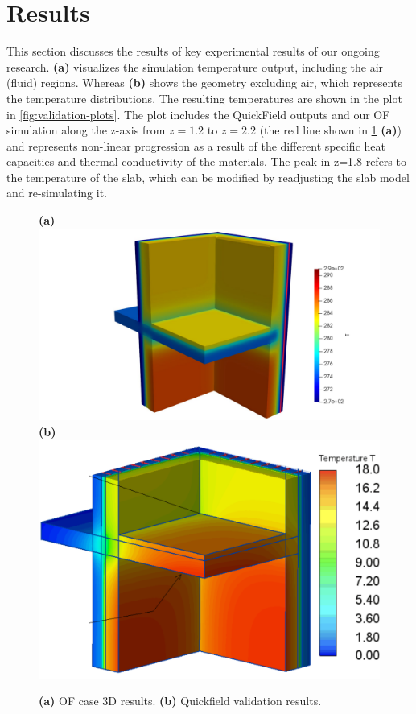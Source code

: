\afterpage{\clearpage}
\section{Results}

This section discusses the results of key experimental results of our ongoing research. 
 \textbf{(a)} visualizes the simulation temperature output, including the air (fluid) regions. Whereas
 \textbf{(b)} shows the geometry excluding air, which represents the temperature distributions. The resulting temperatures are shown in the plot in \cref{fig:validation-plots}. The plot includes the QuickField outputs and our \gls{OF} simulation along the z-axis from $z= 1.2$ to $z=2.2$ (the red line shown in \cref{paraview} \textbf{(a)}) and represents non-linear progression as a result of the different specific heat capacities and thermal conductivity of the materials. The peak in z=1.8 refers to the temperature of the slab, which can be modified by readjusting the slab model and re-simulating it. 



\begin{figure}[htb]
    \centering
    \textbf{(a)}\includegraphics[trim=5cm 0cm 4.5cm 0cm, clip, width=0.70\linewidth]{Figures/newvalleg.pdf}
    \textbf{(b)}\includegraphics[width=0.65\columnwidth]{Figures/ValidationCaseClean.png}
\hspace{0.7cm}
    \caption[3D Validation Visualization]{\textbf{(a)} \gls{OF} case 3D results. \textbf{(b)} Quickfield validation results.}
    \label{paraview}
\end{figure}



